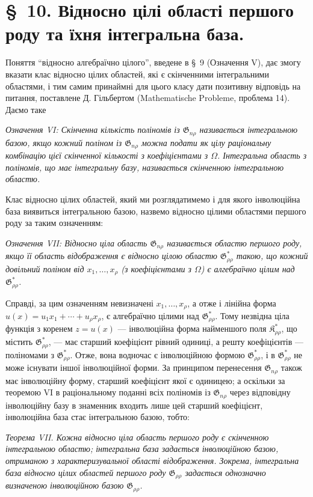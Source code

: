 \documentclass[11pt]{article}
\providecommand{\Kfield}{\mathfrak{K}}
\providecommand{\Gdom}{\mathfrak{G}}
\begin{document}
\section*{\S\ 10. Відносно цілі області першого роду та їхня інтегральна база.}

Поняття ``відносно алгебраїчно цілого'', введене в \S\ 9 (Означення V), дає змогу вказати клас відносно цілих областей, які є скінченними інтегральними областями, і тим самим принаймні для цього класу дати позитивну відповідь на питання, поставлене Д. Гільбертом (Mathematische Probleme, проблема 14). Даємо таке

\emph{Означення VI: Скінченна кількість поліномів із $\Gdom_{n\rho}$ називається інтегральною базою, якщо кожний поліном із $\Gdom_{n\rho}$ можна подати як цілу раціональну комбінацію цієї скінченної кількості з коефіцієнтами з $\Omega$. Інтегральна область з поліномів, що має інтегральну базу, називається скінченною інтегральною областю.}

Клас відносно цілих областей, який ми розглядатимемо і для якого інволюційна база виявиться інтегральною базою, назвемо відносно цілими областями першого роду за таким означенням:

\emph{Означення VII: Відносно ціла область $\Gdom_{n\rho}$ називається областю першого роду, якщо її область відображення є відносно цілою областю $\Gdom^*_{\rho\rho}$ такою, що кожний довільний поліном від $x_1,\ldots,x_\rho$ (з коефіцієнтами з $\Omega$) є алгебраїчно цілим над $\Gdom^*_{\rho\rho}$.}

Справді, за цим означенням невизначені $x_1,\ldots,x_\rho$, а отже і лінійна форма $u(x)=u_1x_1+\cdots+u_\rho x_\rho$, є алгебраїчно цілими над $\Gdom^*_{\rho\rho}$. Тому незвідна ціла функція з коренем $z=u(x)$ --- інволюційна форма найменшого поля $\Kfield^*_{\rho\rho}$, що містить $\Gdom^*_{\rho\rho}$, --- має старший коефіцієнт рівний одиниці, а решту коефіцієнтів --- поліномами з $\Gdom^*_{\rho\rho}$. Отже, вона водночас є інволюційною формою $\Gdom^*_{\rho\rho}$, і в $\Gdom^*_{\rho\rho}$ не може існувати іншої інволюційної форми. За принципом перенесення $\Gdom_{n\rho}$ також має інволюційну форму, старший коефіцієнт якої є одиницею; а оскільки за теоремою VI в раціональному поданні всіх поліномів із $\Gdom_{n\rho}$ через відповідну інволюційну базу в знаменник входить лише цей старший коефіцієнт, інволюційна база стає інтегральною базою, тобто:

\emph{Теорема VII. Кожна відносно ціла область першого роду є скінченною інтегральною областю; інтегральна база задається інволюційною базою, отриманою з характеризувальної області відображення. Зокрема, інтегральна база відносно цілих областей першого роду $\Gdom_{\rho\rho}$ задається однозначно визначеною інволюційною базою $\Gdom_{\rho\rho}$.}
\end{document}
